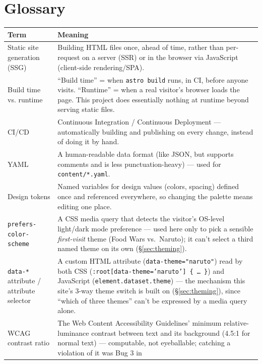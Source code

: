 \documentclass[11pt]{article}
\begin{document}
\section{Glossary}
\label{sec:glossary}

\begin{longtable}{@{}p{4.0cm}p{10.5cm}@{}}
\toprule
\textbf{Term} & \textbf{Meaning} \\
\midrule
\endhead
Static site generation (SSG) &
  Building HTML files once, ahead of time, rather than per-request on a
  server (SSR) or in the browser via JavaScript (client-side
  rendering/SPA). \\[4pt]
Build time vs. runtime &
  ``Build time'' = when \texttt{astro build} runs, in CI, before anyone
  visits. ``Runtime'' = when a real visitor's browser loads the page.
  This project does essentially nothing at runtime beyond serving static
  files. \\[4pt]
CI/CD &
  Continuous Integration / Continuous Deployment --- automatically
  building and publishing on every change, instead of doing it by
  hand. \\[4pt]
YAML &
  A human-readable data format (like JSON, but supports comments and is
  less punctuation-heavy) --- used for \texttt{content/*.yaml}. \\[4pt]
Design tokens &
  Named variables for design values (colors, spacing) defined once and
  referenced everywhere, so changing the palette means editing one
  place. \\[4pt]
\texttt{prefers-color-scheme} &
  A CSS media query that detects the visitor's OS-level light/dark mode
  preference --- used here only to pick a sensible \emph{first-visit}
  theme (Food Wars vs.\ Naruto); it can't select a third named theme on
  its own (\S\ref{sec:theming}). \\[4pt]
\texttt{data-*} attribute / attribute selector &
  A custom HTML attribute (\texttt{data-theme="naruto"}) read by both CSS
  (\texttt{:root[data-theme='naruto'] \{ \ldots\ \}}) and JavaScript
  (\texttt{element.dataset.theme}) --- the mechanism this site's 3-way
  theme switch is built on (\S\ref{sec:theming}), since ``which of three
  themes'' can't be expressed by a media query alone. \\[4pt]
WCAG contrast ratio &
  The Web Content Accessibility Guidelines' minimum relative-luminance
  contrast between text and its background (4.5:1 for normal text) ---
  computable, not eyeballable; catching a violation of it was Bug 3 in

\end{longtable}
\end{document}
